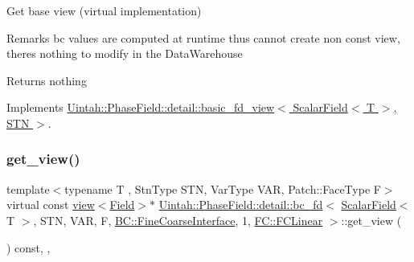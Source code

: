 Get base view (virtual implementation) 

\begin{DoxyRemark}{Remarks}
bc values are computed at runtime thus cannot create non const view, there\textquotesingle{}s nothing to modify in the Data\+Warehouse
\end{DoxyRemark}
\begin{DoxyReturn}{Returns}
nothing 
\end{DoxyReturn}


Implements \hyperlink{classUintah_1_1PhaseField_1_1detail_1_1basic__fd__view_3_01ScalarField_3_01T_01_4_00_01STN_01_4_a2bbf870b332cfd997ec5297428019bc8}{Uintah\+::\+Phase\+Field\+::detail\+::basic\+\_\+fd\+\_\+view$<$ Scalar\+Field$<$ T $>$, S\+T\+N $>$}.

\mbox{\label{classUintah_1_1PhaseField_1_1detail_1_1bc__fd_3_01ScalarField_3_01T_01_4_00_01STN_00_01VAR_00_01f836207db876ecd28bf65f631f79030f_a03ab09ea8008b24b6cbffe0ce8e14388}} 
\subsubsection{\texorpdfstring{get\+\_\+view()}{get\_view()}\hspace{0.1cm}{\footnotesize\ttfamily [2/2]}}
{\footnotesize\ttfamily template$<$typename T , Stn\+Type S\+TN, Var\+Type V\+AR, Patch\+::\+Face\+Type F$>$ \\
virtual const \hyperlink{classUintah_1_1PhaseField_1_1detail_1_1view}{view}$<$\hyperlink{structUintah_1_1PhaseField_1_1ScalarField}{Field}$>$$\ast$ \hyperlink{classUintah_1_1PhaseField_1_1detail_1_1bc__fd}{Uintah\+::\+Phase\+Field\+::detail\+::bc\+\_\+fd}$<$ \hyperlink{structUintah_1_1PhaseField_1_1ScalarField}{Scalar\+Field}$<$ T $>$, S\+TN, V\+AR, F, \hyperlink{namespaceUintah_1_1PhaseField_a148fba372aa3be96fd6eede7a2fa10b5ad2d89be9637ff8b537fa4b6026c0e574}{B\+C\+::\+Fine\+Coarse\+Interface}, 1, \hyperlink{namespaceUintah_1_1PhaseField_aeb51fe956fe07f1487f5878f4039f27ca7460527a4d3065117218d8822530ed6a}{F\+C\+::\+F\+C\+Linear} $>$\+::get\+\_\+view (\begin{DoxyParamCaption}{ }\end{DoxyParamCaption}) const\hspace{0.3cm}{\ttfamily [inline]}, {\ttfamily [override]}, {\ttfamily [virtual]}}



